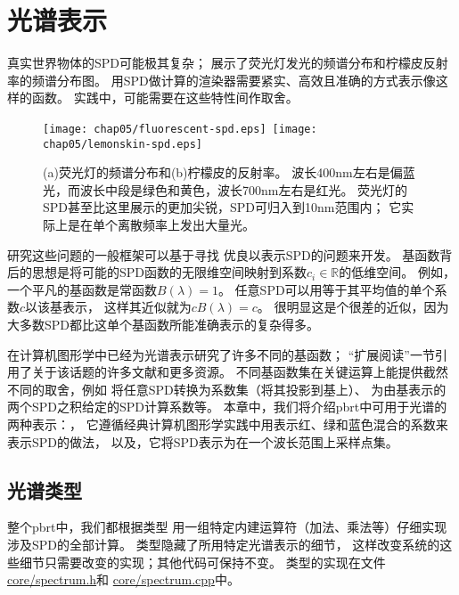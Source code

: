 \section{光谱表示}\label{sec:光谱表示}

真实世界物体的SPD可能极其复杂；
展示了荧光灯发光的频谱分布和柠檬皮反射率的频谱分布图。
用SPD做计算的渲染器需要紧实、高效且准确的方式表示像这样的函数。
实践中，可能需要在这些特性间作取舍。
\begin{figure}[htbp]
    \centering
    \texttt{[image: chap05/fluorescent-spd.eps]}\,\nolinebreak
    \texttt{[image: chap05/lemonskin-spd.eps]}
    \caption{(a)荧光灯的频谱分布和(b)柠檬皮的反射率。
        波长400nm左右是偏蓝光，而波长中段是绿色和黄色，波长700nm左右是红光。
        荧光灯的SPD甚至比这里展示的更加尖锐，SPD可归入到10nm范围内；
        它实际上是在单个离散频率上发出大量光。}
    \label{fig:5.1}
\end{figure}

研究这些问题的一般框架可以基于寻找
优良以表示SPD的问题来开发。
基函数背后的思想是将可能的SPD函数的无限维空间映射到系数$c_i\in\mathbb{R}$的低维空间。
例如，一个平凡的基函数是常函数$B(\lambda)=1$。
任意SPD可以用等于其平均值的单个系数$c$以该基表示，
这样其近似就为$cB(\lambda)=c$。
很明显这是个很差的近似，因为大多数SPD都比这单个基函数所能准确表示的复杂得多。

在计算机图形学中已经为光谱表示研究了许多不同的基函数；
“扩展阅读”一节引用了关于该话题的许多文献和更多资源。
不同基函数集在关键运算上能提供截然不同的取舍，例如
将任意SPD转换为系数集（将其投影到基上）、
为由基表示的两个SPD之积给定的SPD计算系数等。
本章中，我们将介绍pbrt中可用于光谱的两种表示：，
它遵循经典计算机图形学实践中用表示红、绿和蓝色混合的系数来表示SPD的做法，
以及，它将SPD表示为在一个波长范围上采样点集。

\subsection{光谱类型}\label{sub:光谱类型}
整个pbrt中，我们都根据类型
用一组特定内建运算符（加法、乘法等）仔细实现涉及SPD的全部计算。
类型隐藏了所用特定光谱表示的细节，
这样改变系统的这些细节只需要改变的实现；其他代码可保持不变。
类型的实现在文件\href{https://github.com/mmp/pbrt-v3/blob/master/src/core/spectrum.h}{\ttfamily core/spectrum.h}和
\href{https://github.com/mmp/pbrt-v3/blob/master/src/core/spectrum.cpp}{\ttfamily core/spectrum.cpp}中。


